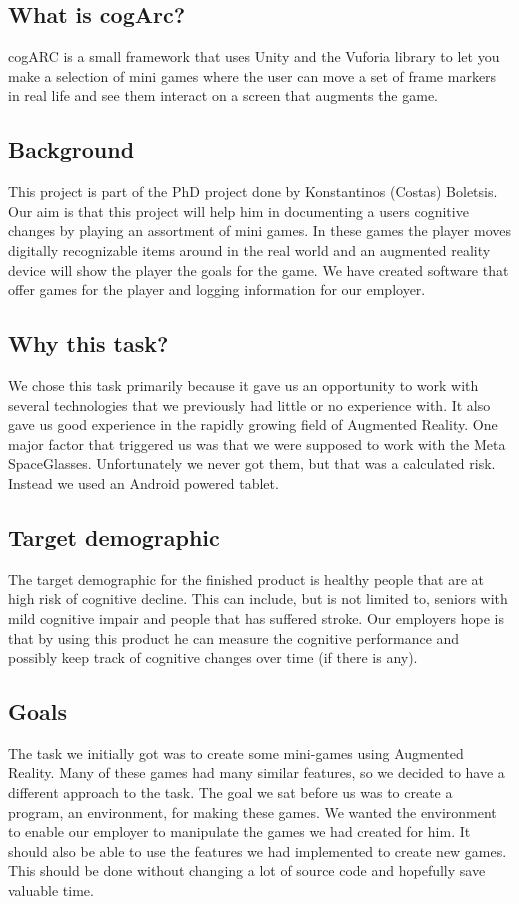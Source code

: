\subsection{What is cogArc?}
cogARC is a small framework that uses Unity and the Vuforia library to let you make a selection of mini games where the user can move a set of frame markers in real life and see them interact on a screen that augments the game.

\subsection{Background}
This project is part of the PhD project done by Konstantinos (Costas) Boletsis. Our aim is that this project will help him in documenting a users cognitive changes by playing an assortment of mini games. In these games the player moves digitally recognizable items around in the real world and an augmented reality device will show the player the goals for the game. We have created software that offer games for the player and logging information for our employer.

\subsection{Why this task?}
We chose this task primarily because it gave us an opportunity to work with several technologies that we previously had little or no experience with.
It also gave us good experience in the rapidly growing field of \gls{Augmented Reality}. 
One major factor that triggered us was that we were supposed to work with the 
\gls{Meta SpaceGlasses}. Unfortunately we never got them, but that was a
calculated risk. Instead we used an Android powered tablet.

\subsection{Target demographic}
The target demographic for the finished product is healthy people that are at high risk of cognitive decline. This can include, but is not limited to, seniors with mild cognitive impair and people that has suffered stroke.
Our employers hope is that by using this product he can measure the cognitive performance and possibly keep track of cognitive changes over time (if there is any).

\subsection{Goals}
The task we initially got was to create some mini-games using \gls{Augmented Reality}. Many of these games had many similar features, so we decided to have a different approach to the task. The goal we sat before us was to create a program, an environment, for making these games. We wanted the environment to enable our employer to manipulate the games we had created for him. It should also be able to use the features we had implemented to create new games. This should be done without changing a lot of source code and hopefully save valuable time.


